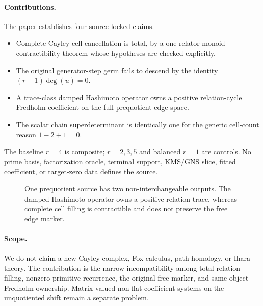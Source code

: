\paragraph{Contributions.}
The paper establishes four source-locked claims.

\begin{itemize}
\item Complete Cayley-cell cancellation is total, by a one-relator monoid
contractibility theorem whose hypotheses are checked explicitly.
\item The original generator-step germ fails to descend by the identity
$(r-1)\deg(u)=0$.
\item A trace-class damped Hashimoto operator owns a positive relation-cycle
Fredholm coefficient on the full prequotient edge space.
\item The scalar chain superdeterminant is identically one for the generic
cell-count reason $1-2+1=0$.
\end{itemize}

The baseline $r=4$ is composite; $r=2,3,5$ and balanced $r=1$ are controls.
No prime basis, factorization oracle, terminal support, KMS/GNS slice, fitted
coefficient, or target-zero data defines the source.

\begin{figure}[t]
\centering

\caption{One prequotient source has two non-interchangeable outputs.  The
damped Hashimoto operator owns a positive relation trace, whereas complete
cell filling is contractible and does not preserve the free edge marker.}
\label{fig:object-firewall}
\end{figure}

\paragraph{Scope.}
We do not claim a new Cayley-complex, Fox-calculus, path-homology, or Ihara
theory.  The contribution is the narrow incompatibility among total relation
filling, nonzero primitive recurrence, the original free marker, and
same-object Fredholm ownership.  Matrix-valued non-flat coefficient systems
on the unquotiented shift remain a separate problem.

